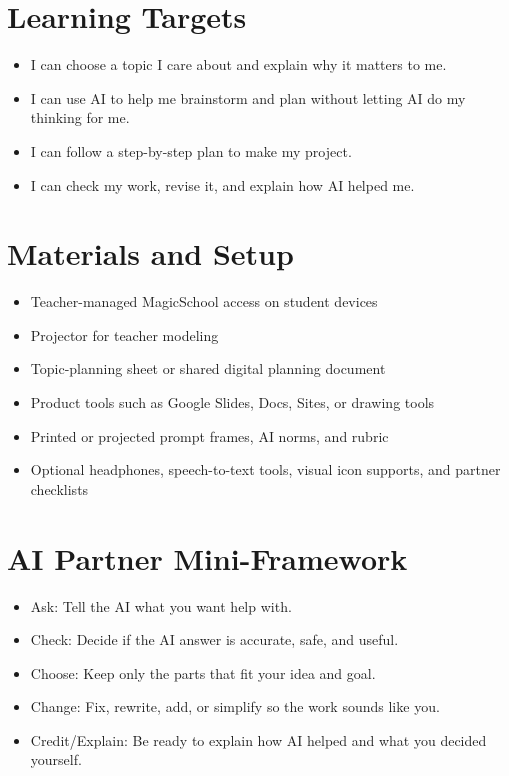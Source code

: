 \documentclass[11pt]{article}
\begin{document}
\section*{Learning Targets}
\begin{itemize}
\item I can choose a topic I care about and explain why it matters to me.
\item I can use AI to help me brainstorm and plan without letting AI do my thinking for me.
\item I can follow a step-by-step plan to make my project.
\item I can check my work, revise it, and explain how AI helped me.
\end{itemize}

\section*{Materials and Setup}
\begin{itemize}
\item Teacher-managed MagicSchool access on student devices
\item Projector for teacher modeling
\item Topic-planning sheet or shared digital planning document
\item Product tools such as Google Slides, Docs, Sites, or drawing tools
\item Printed or projected prompt frames, AI norms, and rubric
\item Optional headphones, speech-to-text tools, visual icon supports, and partner checklists
\end{itemize}

\section*{AI Partner Mini-Framework}
\begin{itemize}
\item Ask: Tell the AI what you want help with.
\item Check: Decide if the AI answer is accurate, safe, and useful.
\item Choose: Keep only the parts that fit your idea and goal.
\item Change: Fix, rewrite, add, or simplify so the work sounds like you.
\item Credit/Explain: Be ready to explain how AI helped and what you decided yourself.
\end{itemize}
\end{document}
